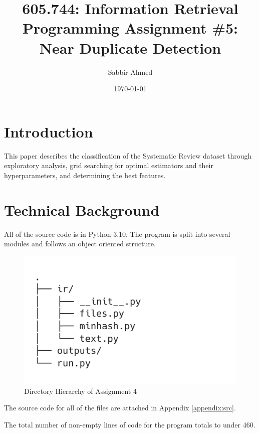 \documentclass[11pt]{article}
\title{605.744: Information Retrieval \\ Programming Assignment \#5: Near Duplicate Detection}
\author{Sabbir Ahmed}
\date{\today}
\begin{document}
\maketitle	
\tableofcontents
\clearpage
\newpage

\section{Introduction}
This paper describes the classification of the Systematic Review dataset through exploratory analysis, grid searching for optimal estimators and their hyperparameters, and determining the best features.

\section{Technical Background}
All of the source code is in Python 3.10. The program is split into several modules and follows an object oriented structure.


\begin{figure}[!ht]
    \centering
    \includegraphics[trim={0 0 15cm 3cm},clip,scale=0.3]{statics/dirtree.png}
    \caption{Directory Hierarchy of Assignment 4}
\end{figure}

The source code for all of the files are attached in Appendix \ref{appendix:src}.

The total number of non-empty lines of code for the program totals to under 460.
\end{document}

